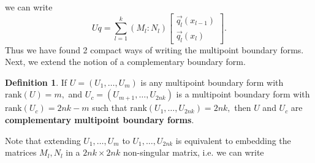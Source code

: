 \documentclass[11pt,reqno,oneside,a4paper]{article}
\theoremstyle{plain} %
\theoremstyle{definition}
\newtheorem{definition}[theorem]{Definition}
\theoremstyle{remark}
\begin{document}
we can write 
\[ Uq = \sum^k_{l=1}(M_l:N_l) 
\begin{bmatrix}
\vec{q_l}(x_{l-1})  \\
\vec{q_l}(x_{l})
\end{bmatrix}.
\]
Thus we have found 2 compact ways of writing the multipoint boundary forms. Next, we extend the notion of a complementary boundary form.
\newline
\begin{definition}
If $U = (U_1, \ldots, U_m)$ is any multipoint boundary form with $\mathrm{rank}(U) = m,$ and $U_c = (U_{m+1}, \ldots, U_{2nk})$ is a multipoint boundary form with $\mathrm{rank}(U_c) = 2nk-m$ such that $\mathrm{rank}(U_{1}, \ldots, U_{2nk}) = 2nk,$ then $U$ and $U_c$ are \textbf{complementary multipoint boundary forms}. 
\end{definition}
Note that extending $U_1, \ldots, U_m$ to $U_{1}, \ldots, U_{2nk}$ is equivalent to embedding the matrices $M_l, N_l$ in a $2nk \times 2nk$ non-singular matrix, i.e. we can write
\end{document}
